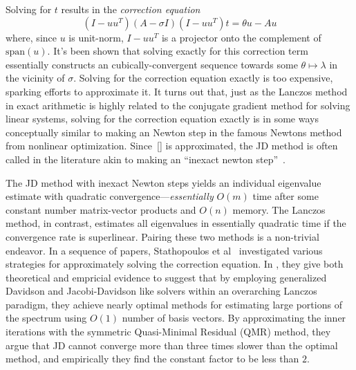 \documentclass[10pt]{article}
\numberwithin{equation}{section}
\newcommand{\+}{%
	\raisebox{0.18ex}{\scaleobj{0.55}{+}}
}
\theoremstyle{definition}
\theoremstyle{definition}
\begin{document}
Solving for $t$ results in the \emph{correction equation}
\begin{equation}
	(I - u u^T)(A - \sigma I )(I - u u^T) t = \theta u - A u 
\end{equation}
where, since $u$ is unit-norm, $I - u u^T$ is a projector onto the complement of $\mathrm{span}(u)$. 
It's been shown that solving exactly for this correction term essentially constructs an cubically-convergent sequence towards some $\theta \mapsto \lambda$ in the vicinity of $\sigma$. Solving for the correction equation exactly is too expensive, sparking efforts to approximate it. It turns out that, just as the Lanczos method in exact arithmetic is highly related to the conjugate gradient method for solving linear systems, solving for the correction equation exactly is in some ways conceptually similar to making an Newton step in the famous Newtons method from nonlinear optimization. Since~\eqref{} is approximated, the JD method is often called in the literature akin to making an ``inexact newton step''~\cite{}.


The JD method with inexact Newton steps yields an individual eigenvalue estimate with quadratic convergence---\emph{essentially} $O(m)$ time after some constant number matrix-vector products and $O(n)$ memory.
The Lanczos method, in contrast, estimates all eigenvalues in essentially quadratic time if the convergence rate is superlinear. Pairing these two methods is a non-trivial endeavor. 
In a sequence of papers, Stathopoulos et al~\cite{} investigated various strategies for approximately solving the correction equation. 
In , they give both theoretical and empricial evidence to suggest that by employing generalized Davidson and Jacobi-Davidson like solvers within an overarching Lanczos paradigm, they achieve nearly optimal methods for estimating large portions of the spectrum using $O(1)$ number of basis vectors. By approximating the inner iterations with the symmetric Quasi-Minimal Residual (QMR) method, they argue that JD cannot converge more than three times slower than the optimal method, and empirically they find the constant factor to be less than $2$. 
\end{document}
